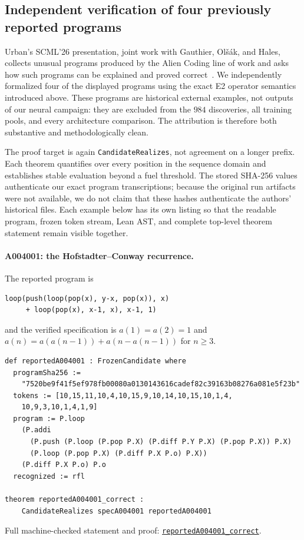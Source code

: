 \documentclass[11pt]{article}
\newcommand{\code}[1]{\texttt{#1}}
\newcommand{\formalcommit}{f3a31db36bb2f944312ee31c1d86c2758109e83a}
\newcommand{\formalblob}{https://github.com/zariuq/MeTTapedia/blob/\formalcommit/lean/mettapedia/Mettapedia}
\newcommand{\leansource}[3]{%
  \href{\formalblob/#1\#L#2}{\nolinkurl{#3}}}
\begin{document}
\subsection{Independent verification of four previously reported programs}
\label{sec:reported-programs}

Urban's SCML'26 presentation, joint work with Gauthier, Ol\v{s}\'ak, and Hales,
collects unusual programs produced by the Alien Coding line of work and asks how such
programs can be explained and proved correct~\cite{gauthier2023,urban2026slides}. We independently
formalized four of the displayed programs using the exact E2 operator semantics introduced
above. These programs are historical external examples, not outputs of our neural campaign:
they are excluded from the $984$ discoveries, all training pools, and every architecture
comparison. The attribution is therefore both substantive and methodologically clean.

The proof target is again \code{CandidateRealizes}, not agreement on a longer prefix.
Each theorem quantifies over every position in the sequence domain and establishes stable
evaluation beyond a fuel threshold. The stored SHA-256 values authenticate our exact
program transcriptions; because the original run artifacts were not available, we do not
claim that these hashes authenticate the authors' historical files. Each example below
has its own listing so that the readable program, frozen token stream, Lean AST, and complete
top-level theorem statement remain visible together.

\paragraph{A004001: the Hofstadter--Conway recurrence.}
The reported program is
\begin{lstlisting}
loop(push(loop(pop(x), y-x, pop(x)), x)
     + loop(pop(x), x-1, x), x-1, 1)
\end{lstlisting}
and the verified specification is
$a(1)=a(2)=1$ and
$a(n)=a(a(n-1))+a(n-a(n-1))$ for $n\geq 3$.
\begin{lstlisting}[caption={The reported A004001 artifact and its universal Lean theorem.}]
def reportedA004001 : FrozenCandidate where
  programSha256 :=
    "7520be9f41f5ef978fb00080a0130143616cadef82c39163b08276a081e5f23b"
  tokens := [10,15,11,10,4,10,15,9,10,14,10,15,10,1,4,
    10,9,3,10,1,4,1,9]
  program := P.loop
    (P.addi
      (P.push (P.loop (P.pop P.X) (P.diff P.Y P.X) (P.pop P.X)) P.X)
      (P.loop (P.pop P.X) (P.diff P.X P.o) P.X))
    (P.diff P.X P.o) P.o
  recognized := rfl

theorem reportedA004001_correct :
    CandidateRealizes specA004001 reportedA004001
\end{lstlisting}
\noindent Full machine-checked statement and proof:
\leansource{GSLT/LanguageDef/Gauthier/ReportedSequencePrograms.lean}{371-L386}{reportedA004001_correct}.
\end{document}
